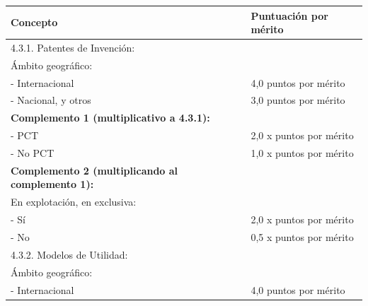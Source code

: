 \documentclass{article}
\begin{document}
\begin{itemize}
\begin{itemize}
\begin{scriptsize}
                  \vspace{0.4cm}
                  \begin{table}[h!]\centering\renewcommand{\arraystretch}{1.3}
                    \begin{tabular}{|p{}|p{}|}\hline
                      Concepto                                                 & Puntuación por mérito   \\\hline
                      4.3.1. Patentes de Invención:                            &                         \\\hline
                      Ámbito geográfico:                                       &                         \\\hline
                      - Internacional                                          & 4,0 puntos por mérito   \\\hline
                      - Nacional, y otros                                      & 3,0 puntos por mérito   \\\hline
                      \textbf{Complemento 1 (multiplicativo a 4.3.1):}         &                         \\\hline
                      - PCT                                                    & 2,0 x puntos por mérito \\\hline
                      - No PCT                                                 & 1,0 x puntos por mérito \\\hline
                      \textbf{Complemento 2 (multiplicando al complemento 1):} &                         \\\hline
                      En explotación, en exclusiva:                            &                         \\\hline
                      - Sí                                                     & 2,0 x puntos por mérito \\\hline
                      - No                                                     & 0,5 x puntos por mérito \\\hline
                      4.3.2. Modelos de Utilidad:                              &                         \\\hline
                      Ámbito geográfico:                                       &                         \\\hline
                      - Internacional                                          & 4,0 puntos por mérito   \\\hline

\end{tabular}
\end{table}
\end{scriptsize}
\end{itemize}
\end{itemize}
\end{document}

